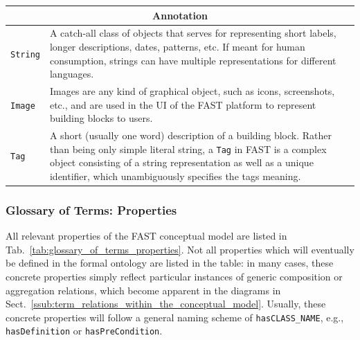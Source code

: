 \documentclass{article}
\begin{document}
\begin{small}
\begin{longtable}{|p{4.25cm}|p{10cm}|}
\multicolumn{2}{|c|}{\textbf{Annotation}} \\ \hline
\texttt{String} & A catch-all class of objects that serves for representing short labels, longer descriptions, dates, patterns, etc. If meant for human consumption, strings can have multiple representations for different languages. \\ \hline
\texttt{Image} & Images are any kind of graphical object, such as icons, screenshots, etc., and are used in the UI of the FAST platform to represent building blocks to users. \\ \hline
\texttt{Tag} & A short (usually one word) description of a building block. Rather than being only simple literal string, a \texttt{Tag} in FAST is a complex object consisting of a string representation as well as a unique identifier, which unambiguously specifies the tags meaning. \\ \hline
\end{longtable}
\end{small}
\doublespacing


\subsubsection{Glossary of Terms: Properties} %
\label{subs:properties}

All relevant properties of the FAST conceptual model are listed in Tab.~\ref{tab:glossary_of_terms_properties}. Not all properties which will eventually be defined in the formal ontology are listed in the table: in many cases, these concrete properties simply reflect particular instances of generic composition or aggregation relations, which become apparent in the diagrams in Sect.~\ref{ssub:term_relations_within_the_conceptual_model}. Usually, these concrete properties will follow a general naming scheme of \texttt{hasCLASS\_NAME}, e.g., \texttt{hasDefinition} or \texttt{hasPreCondition}.
\end{document}
